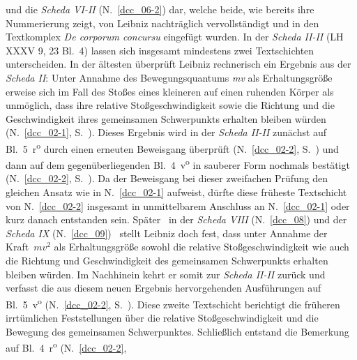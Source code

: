 und die \textit{Scheda VI-II} (N.~\ref{dcc_06-2}) %
dar, welche beide, wie bereits ihre Nummerierung zeigt, von Leibniz nachträglich vervollständigt und in den Textkomplex \textit{De corporum concursu} eingefügt wurden.
\pend%
%
\pstart%
In%
der \textit{Scheda II-II} (LH XXXV 9, 23 Bl.~4) lassen sich insgesamt mindestens zwei Textschichten unterscheiden.
In der ältesten überprüft Leibniz rechnerisch ein Ergebnis aus der \textit{Scheda II}:
Unter Annahme des Bewegungsquantums \textit{mv} als Erhaltungsgröße erweise sich im Fall des Stoßes eines kleineren auf einen ruhenden Körper als unmöglich, dass ihre relative Stoßgeschwindigkeit sowie die Richtung und die Geschwindigkeit ihres gemeinsamen Schwerpunkts erhalten bleiben würden (N.~\ref{dcc_02-1}, %
S.~).
Dieses Ergebnis wird in der \textit{Scheda II-II} zunächst auf Bl.~5~r\textsuperscript{o} durch einen erneuten Beweisgang überprüft (N.~\ref{dcc_02-2}, %
S.~)
und dann auf dem gegenüberliegenden Bl.~4~v\textsuperscript{o} in sauberer Form nochmals bestätigt (N.~\ref{dcc_02-2}, %
S.~).
Da der Beweisgang bei dieser zweifachen Prüfung den gleichen Ansatz wie in N.~\ref{dcc_02-1} %
aufweist, dürfte diese früheste Textschicht von N.~\ref{dcc_02-2} %
insgesamt in unmittelbarem Anschluss an N.~\ref{dcc_02-1} %
oder kurz danach entstanden sein.
Später \textendash\ in der \textit{Scheda VIII} (N.~\ref{dcc_08}) %
und der \textit{Scheda IX} (N.~\ref{dcc_09}) %
\textendash\ stellt Leibniz doch fest, dass unter Annahme der \glqq Kraft\grqq\ $mv^2$ als Erhaltungsgröße sowohl die relative Stoßgeschwindigkeit wie auch die Richtung und Geschwindigkeit des gemeinsamen Schwerpunkts erhalten bleiben würden.
Im Nachhinein kehrt er somit zur \textit{Scheda II-II} zurück und verfasst die aus diesem neuen Ergebnis hervorgehenden Ausführungen auf Bl.~5~v\textsuperscript{o} (N.~\ref{dcc_02-2}, %
S.~).
Diese zweite Textschicht berichtigt die früheren irrtümlichen Feststellungen über die relative Stoßgeschwindigkeit und die Bewegung des gemeinsamen Schwerpunktes.
Schließlich entstand die Bemerkung auf Bl.~4~r\textsuperscript{o} (N.~\ref{dcc_02-2}, %
